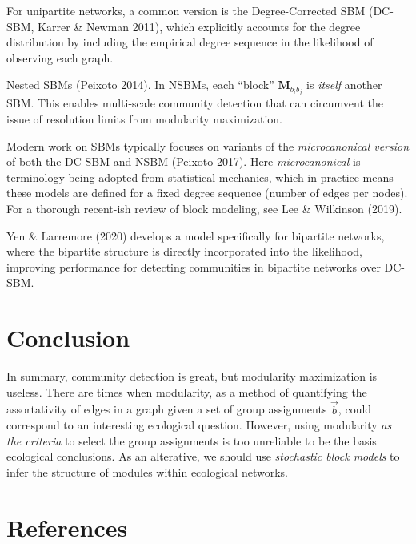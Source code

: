 \documentclass[
]{article}
\begin{document}
For unipartite networks, a common version is the Degree-Corrected SBM
(DC-SBM, Karrer \& Newman 2011), which explicitly accounts for the
degree distribution by including the empirical degree sequence in the
likelihood of observing each graph.

Nested SBMs (Peixoto 2014). In NSBMs, each ``block''
\(\mathbf{M}_{b_i b_j}\) is \emph{itself} another SBM. This enables
multi-scale community detection that can circumvent the issue of
resolution limits from modularity maximization.

Modern work on SBMs typically focuses on variants of the
\emph{microcanonical version} of both the DC-SBM and NSBM (Peixoto
2017). Here \emph{microcanonical} is terminology being adopted from
statistical mechanics, which in practice means these models are defined
for a fixed degree sequence (number of edges per nodes). For a thorough
recent-ish review of block modeling, see Lee \& Wilkinson (2019).

Yen \& Larremore (2020) develops a model specifically for bipartite
networks, where the bipartite structure is directly incorporated into
the likelihood, improving performance for detecting communities in
bipartite networks over DC-SBM.

\hypertarget{conclusion}{%
\section{Conclusion}\label{conclusion}}

In summary, community detection is great, but modularity maximization is
useless. There are times when modularity, as a method of quantifying the
assortativity of edges in a graph given a set of group assignments
\(\vec{b}\), could correspond to an interesting ecological question.
However, using modularity \emph{as the criteria} to select the group
assignments is too unreliable to be the basis ecological conclusions. As
an alterative, we should use \emph{stochastic block models} to infer the
structure of modules within ecological networks.

\hypertarget{references}{%
\section*{References}\label{references}}
\end{document}
